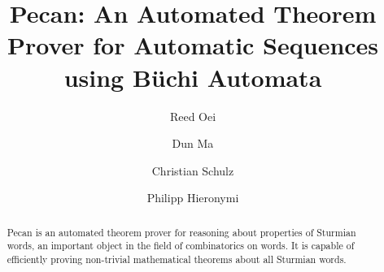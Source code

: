 \documentclass[dvipsnames,runningheads]{llncs}
\begin{document}
\title{Pecan: An Automated Theorem Prover for Automatic Sequences using B\"uchi Automata}


\author{Reed Oei \and
Dun Ma \and
Christian Schulz \and
Philipp Hieronymi}


\maketitle

\begin{abstract}
Pecan is an automated theorem prover for reasoning about properties of Sturmian words, an important object in the field of combinatorics on words. It is capable of efficiently proving non-trivial mathematical theorems about all Sturmian words.
\end{abstract}






%




\end{document}
